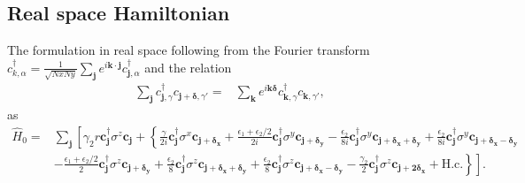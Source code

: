 \documentclass[aps,prb,amsmath,amssymb,twocolumn, superscriptaddress]{revtex4-2}
\begin{document}
\subsection{Real space Hamiltonian}
The formulation in real space following from the Fourier transform $c_{k, \alpha}^\dagger = \frac{1}{\sqrt{Nx Ny}} \sum_{\bm j} e^{i \bm k \cdot \bm j} c_{\bm j , \alpha}^\dagger$ and the relation 
\begin{align}
\sum_{\bm j } c^\dagger_{\bm{j}, \gamma} c_{\bm{j} + \bm \delta, \gamma'} =& \sum_{\bm k} e^{i \bm k \bm \delta} c^\dagger_{\bm k, \gamma} c_{\bm k, \gamma'},
\end{align}
as
\begin{align}
\hat H_{0} = & \sum_{\bm j} \left [\gamma_2 r \bm c_{\bm{j}}^\dagger \sigma^z \bm c_{\bm{j }} + \left \{\frac{\gamma}{2i} \bm c_{\bm{j}}^\dagger \sigma^x \bm c_{\bm{j + \delta_x}} + \frac{\epsilon_1 + \epsilon_2 / 2}{2i} \bm c_{\bm{j}}^\dagger \sigma^y \bm c_{\bm{j + \delta_y}}  - \frac{\epsilon_2}{8i} \bm c_{\bm{j}}^\dagger \sigma^y \bm c_{\bm{j + \delta_x + \delta_y}}  + \frac{\epsilon_2}{8i} \bm c_{\bm{j}}^\dagger \sigma^y \bm c_{\bm{j + \delta_x - \delta_y}} \right. \right. \nonumber \\
& - \left. \left. \frac{\epsilon_1 + \epsilon_2 / 2}{2} \bm c_{\bm{j}}^\dagger \sigma^z \bm c_{\bm{j  + \delta_y}} + \frac{\epsilon_2}{8} \bm c_{\bm{j}}^\dagger \sigma^z \bm c_{\bm{j  + \delta_x + \delta_y}} +  \frac{\epsilon_2}{8} \bm c_{\bm{j}}^\dagger \sigma^z \bm c_{\bm{j  + \delta_x - \delta_y}} - \frac{\gamma_2}{2} \bm c_{\bm{j}}^\dagger \sigma^z \bm c_{\bm{j  + 2 \delta_x}} + \text{H.c.}\right\} \right ].
\end{align}
\end{document}
